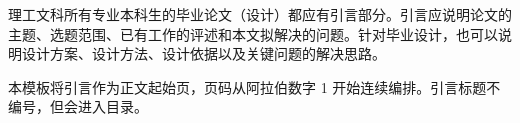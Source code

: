 
\begin{introduction}
理工文科所有专业本科生的毕业论文（设计）都应有引言部分。引言应说明论文的主题、选题范围、已有工作的评述和本文拟解决的问题。针对毕业设计，也可以说明设计方案、设计方法、设计依据以及关键问题的解决思路。

本模板将引言作为正文起始页，页码从阿拉伯数字 1 开始连续编排。引言标题不编号，但会进入目录。
\end{introduction}
